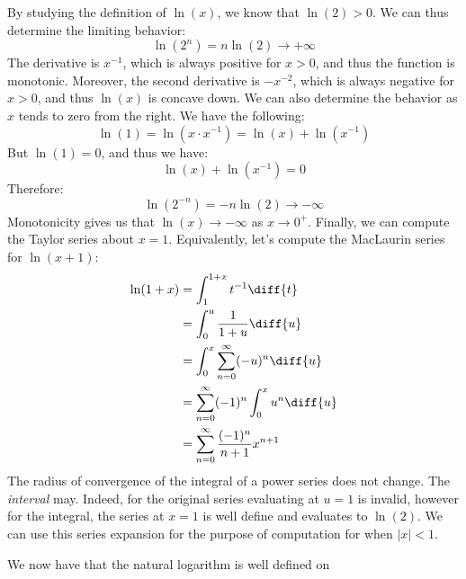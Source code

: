 \documentclass[crop=false,class=book,oneside]{standalone}
\begin{document}
        By studying the definition of $\ln(x)$, we know that
        $\ln(2)>0$. We can thus determine the limiting behavior:
        \begin{equation}
            \ln(2^{n})=n\ln(2)\rightarrow{+\infty}
        \end{equation}
        The derivative is $x^{-1}$, which is always positive
        for $x>0$, and thus the function is monotonic. Moreover,
        the second derivative is $-x^{-2}$, which is always
        negative for $x>0$, and thus $\ln(x)$ is concave down.
        We can also determine the behavior as $x$ tends to
        zero from the right. We have the following:
        \begin{equation}
            \ln(1)=\ln(x\cdot{x}^{-1})=\ln(x)+\ln(x^{-1})
        \end{equation}
        But $\ln(1)=0$, and thus we have:
        \begin{equation}
            \ln(x)+\ln(x^{-1})=0
        \end{equation}
        Therefore:
        \begin{equation}
            \ln(2^{-n})=-n\ln(2)\rightarrow{-\infty}
        \end{equation}
        Monotonicity gives us that $\ln(x)\rightarrow{-\infty}$
        as $x\rightarrow{0^{+}}$. Finally, we can compute the
        Taylor series about $x=1$. Equivalently, let's compute
        the MacLaurin series for $\ln(x+1)$:
        \begin{align}
            \ln(1+x)&=\int_{1}^{1+x}t^{-1}\diff{t}\\
            &=\int_{0}^{u}\frac{1}{1+u}\diff{u}\\
            &=\int_{0}^{x}\sum_{n=0}^{\infty}(-u)^{n}\diff{u}\\
            &=\sum_{n=0}^{\infty}(-1)^{n}\int_{0}^{x}u^{n}\diff{u}\\
            &=\sum_{n=0}^{\infty}\frac{(-1)^{n}}{n+1}x^{n+1}
        \end{align}
        The radius of convergence of the integral of a power
        series does not change. The \textit{interval} may.
        Indeed, for the original series evaluating at
        $u=1$ is invalid, however for the integral, the series at
        $x=1$ is well define and evaluates to $\ln(2)$. We can
        use this series expansion for the purpose of computation
        for when $|x|<1$.
        \par\hfill\par
        We now have that the natural logarithm is well defined on
\end{document}
